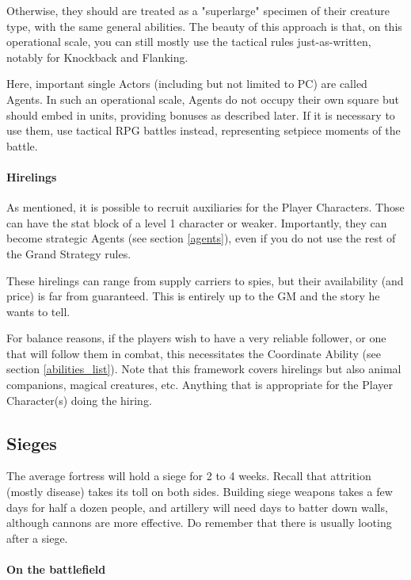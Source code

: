 Otherwise, they should are treated as a "superlarge" specimen of their creature type, with the same general abilities. The beauty of this approach is that, on this operational scale, you can still mostly use the tactical rules just-as-written, notably for Knockback and Flanking.

Here, important single Actors (including but not limited to PC) are called Agents. In such an operational scale, Agents do not occupy their own square but should embed in units, providing bonuses as described later. If it is necessary to use them, use tactical RPG battles instead, representing setpiece moments of the battle.


\paragraph{Hirelings}

As mentioned, it is possible to recruit auxiliaries for the Player Characters. Those can have the stat block of a level 1 character or weaker. Importantly, they can become strategic Agents (see section \ref{agents}), even if you do not use the rest of the Grand Strategy rules.

These hirelings can range from supply carriers to spies, but their availability (and price) is far from guaranteed. This is entirely up to the GM and the story he wants to tell.

For balance reasons, if the players wish to have a very reliable follower, or one that will follow them in combat, this necessitates the Coordinate Ability (see section \ref{abilities_list}). Note that this framework covers hirelings but also animal companions, magical creatures, etc. Anything that is appropriate for the Player Character(s) doing the hiring.

\subsection{Sieges}

The average fortress will hold a siege for 2 to 4 weeks. Recall that attrition (mostly disease) takes its toll on both sides. Building siege weapons takes a few days for half a dozen people, and artillery will need days to batter down walls, although cannons are more effective. Do remember that there is usually looting after a siege.


\paragraph{On the battlefield}

